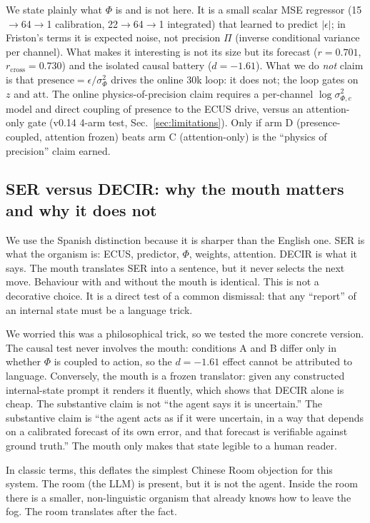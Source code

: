 \documentclass[11pt,a4paper]{article}
\begin{document}
We state plainly what $\Phi$ is and is not here. It is a small scalar MSE regressor (15$\rightarrow$64$\rightarrow$1 calibration, 22$\rightarrow$64$\rightarrow$1 integrated) that learned to predict $|\epsilon|$; in Friston's terms it is expected noise, not precision $\Pi$ (inverse conditional variance per channel). What makes it interesting is not its size but its forecast ($r=0.701$, $r_{\mathrm{cross}}=0.730$) and the isolated causal battery ($d=-1.61$). What we do \textit{not} claim is that $\mathrm{presence}=\epsilon/\sigma_\Phi^2$ drives the online 30k loop: it does not; the loop gates on $z$ and $\mathrm{att}$. The online physics-of-precision claim requires a per-channel $\log \sigma^2_{\Phi,c}$ model and direct coupling of $\mathrm{presence}$ to the ECUS drive, versus an attention-only gate (v0.14 4-arm test, Sec.~\ref{sec:limitations}). Only if arm D (presence-coupled, attention frozen) beats arm C (attention-only) is the ``physics of precision'' claim earned.

\subsection{SER versus DECIR: why the mouth matters and why it does not}

We use the Spanish distinction because it is sharper than the English one. SER is what the organism is: ECUS, predictor, $\Phi$, weights, attention. DECIR is what it says. The mouth translates SER into a sentence, but it never selects the next move. Behaviour with and without the mouth is identical. This is not a decorative choice. It is a direct test of a common dismissal: that any ``report'' of an internal state must be a language trick.

We worried this was a philosophical trick, so we tested the more concrete version. The causal test never involves the mouth: conditions A and B differ only in whether $\Phi$ is coupled to action, so the $d=-1.61$ effect cannot be attributed to language. Conversely, the mouth is a frozen translator: given any constructed internal-state prompt it renders it fluently, which shows that DECIR alone is cheap. The substantive claim is not ``the agent says it is uncertain.'' The substantive claim is ``the agent acts as if it were uncertain, in a way that depends on a calibrated forecast of its own error, and that forecast is verifiable against ground truth.'' The mouth only makes that state legible to a human reader.

In classic terms, this deflates the simplest Chinese Room objection for this system. The room (the LLM) is present, but it is not the agent. Inside the room there is a smaller, non-linguistic organism that already knows how to leave the fog. The room translates after the fact.
\end{document}
